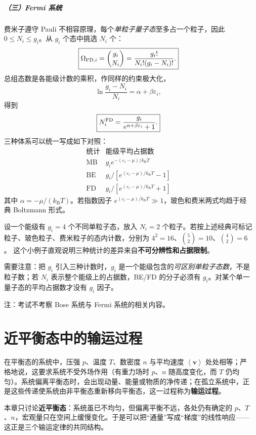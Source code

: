 \documentclass[11pt,a4paper,openany]{ctexbook}
\newcommand{\kb}{k_{\mathrm B}}
\newcommand{\avg}[1]{\left\langle #1\right\rangle}
\newcommand{\vv}{\bm{v}}
\begin{document}
\paragraph{（三）Fermi 系统}
费米子遵守 Pauli 不相容原理，每个\emph{单粒子量子态}至多占一个粒子，因此 $0\le N_i\le g_i$。从 $g_i$ 个态中挑选 $N_i$ 个：
\[
\boxed{\Omega_{{\rm FD},i}=\binom{g_i}{N_i}
=\frac{g_i!}{N_i!(g_i-N_i)!}.}
\]
总组态数是各能级计数的乘积，作同样的约束极大化，
\[
\ln\frac{g_i-N_i}{N_i}=\alpha+\beta\varepsilon_i,
\]
得到
\[
\boxed{N_i^{\rm FD}
=\frac{g_i}{e^{\alpha+\beta\varepsilon_i}+1}.}
\]
三种体系可以统一写成如下对照：
\[
\begin{array}{c|c}
\text{统计}& \text{能级平均占据数}\\\hline
\mathrm{MB}&g_i e^{-(\varepsilon_i-\mu)/\kb T}\\
\mathrm{BE}&g_i/[e^{(\varepsilon_i-\mu)/\kb T}-1]\\
\mathrm{FD}&g_i/[e^{(\varepsilon_i-\mu)/\kb T}+1]
\end{array}
\]
其中 $\alpha=-\mu/(\kb T)$。若指数因子 $e^{(\varepsilon_i-\mu)/\kb T}\gg1$，玻色和费米两式均趋于经典 Boltzmann 形式。

\begin{examplebox}
设一个能级有 $g_i=4$ 个不同单粒子态，放入 $N_i=2$ 个粒子。若按上述经典可标记粒子、玻色粒子、费米粒子的态内计数，分别为
$4^2=16$、$\binom{5}{2}=10$、$\binom{4}{2}=6$。
这个小例子直观说明三种统计的差异来自\textbf{不可分辨性和占据限制}。
\end{examplebox}
\begin{notebox}
需要注意：把 $g_i$ 引入三种计数时，$g_i$ 是一个能级包含的\emph{可区别单粒子态数}，不是粒子数；若 $N_i$ 表示整个能级上的占据数，BE/FD 的分子必须有 $g_i$。对某个单一量子态的平均占据数才没有 $g_i$ 因子。
\end{notebox}
注：考试不考察 Bose 系统与 Fermi 系统的相关内容。

\chapter{近平衡态中的输运过程}

在平衡态的系统中，压强 $p$、温度 $T$、数密度 $n$ 与平均速度 $\avg{\vv}$ 处处相等；严格地说，这要求系统不受外场作用（有重力场时 $p$、$n$ 随高度变化，而 $T$ 仍均匀）。系统偏离平衡态时，会出现动量、能量或物质的净传递；在孤立系统中，正是这些传递使系统由非平衡态重新移向平衡态，这一过程称为\textbf{输运过程}。

本章只讨论\textbf{近平衡态}：系统虽已不均匀，但偏离平衡不远，各处仍有确定的 $p$、$T$、$n$，宏观量只在空间上缓慢变化。于是可以把“通量”写成“梯度”的线性响应——这正是三个输运定律的共同结构。
\end{document}
